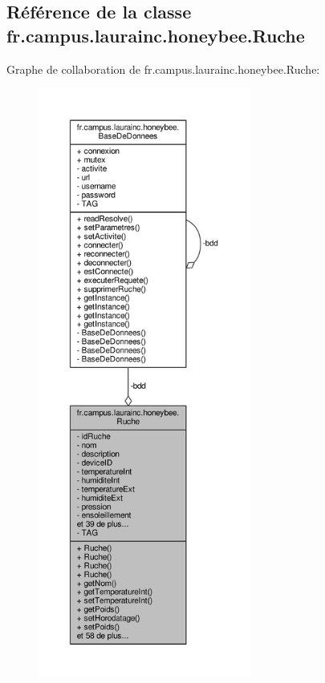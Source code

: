 \hypertarget{classfr_1_1campus_1_1laurainc_1_1honeybee_1_1_ruche}{}\subsection{Référence de la classe fr.\+campus.\+laurainc.\+honeybee.\+Ruche}
\label{classfr_1_1campus_1_1laurainc_1_1honeybee_1_1_ruche}


Graphe de collaboration de fr.\+campus.\+laurainc.\+honeybee.\+Ruche\+:\nopagebreak
\begin{figure}[H]
\begin{center}
\leavevmode
\includegraphics[height=550pt]{classfr_1_1campus_1_1laurainc_1_1honeybee_1_1_ruche__coll__graph}
\end{center}
\end{figure}
